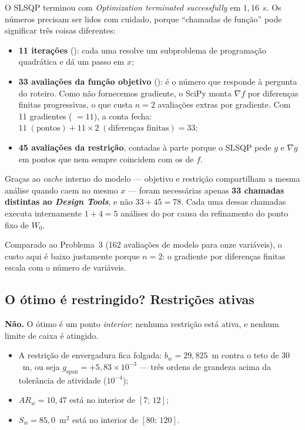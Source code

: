 O SLSQP terminou com \emph{Optimization terminated successfully} em
$1{,}16$~s. Os números precisam ser lidos com cuidado, porque
``chamadas de função'' pode significar três coisas diferentes:

\begin{itemize}
\item \textbf{11 iterações} (): cada uma resolve um subproblema
      de programação quadrática e dá um passo em $x$;
\item \textbf{33 avaliações da função objetivo} (): é o número
      que responde à pergunta do roteiro. Como não fornecemos gradiente,
      o SciPy monta $\nabla f$ por diferenças finitas progressivas, o que
      custa $n = 2$ avaliações extras por gradiente. Com 11 gradientes
      ( $= 11$), a conta fecha:
      $11\;(\text{pontos}) + 11\times 2\;(\text{diferenças finitas}) = 33$;
\item \textbf{45 avaliações da restrição}, contadas à parte porque o
      SLSQP pede $g$ e $\nabla g$ em pontos que nem sempre coincidem com
      os de $f$.
\end{itemize}

Graças ao \emph{cache} interno do modelo --- objetivo e restrição
compartilham a mesma análise quando caem no mesmo $x$ --- foram
necessárias apenas \textbf{33 chamadas distintas ao \emph{Design
Tools}}, e não $33 + 45 = 78$. Cada uma dessas chamadas executa
internamente $1 + 4 = 5$ análises do  por causa do
refinamento do ponto fixo de $W_0$.

Comparado ao Problema~3 (162 avaliações de modelo para onze variáveis), o
custo aqui é baixo justamente porque $n = 2$: o gradiente por diferenças
finitas escala com o número de variáveis.

\subsection{O ótimo é restringido? Restrições ativas}
\label{sec:p2q4}

\textbf{Não.} O ótimo é um ponto \emph{interior}: nenhuma restrição está
ativa, e nenhum limite de caixa é atingido.

\begin{itemize}
\item A restrição de envergadura fica folgada:
      $b_w = 29{,}825$~m contra o teto de $30$~m, ou seja
      $g_{\mathrm{span}} = +5{,}83\times 10^{-3}$ --- três ordens de
      grandeza acima da tolerância de atividade ($10^{-4}$);
\item $AR_w = 10{,}47$ está no interior de $[7;\,12]$;
\item $S_w = 85{,}0$~m$^2$ está no interior de $[80;\,120]$.
\end{itemize}

